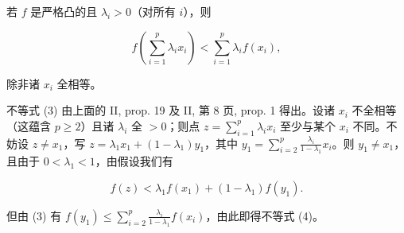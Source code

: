若 \(f\) 是严格凸的且 \(\lambda_i > 0\)（对所有 \(i\)），则

\[
f \left(\sum_ {i = 1} ^ {p} \lambda_ {i} x _ {i}\right) <   \sum_ {i = 1} ^ {p} \lambda_ {i} f \left(x _ {i}\right),\tag{4}
\]

除非诸 \(x_{i}\) 全相等。

不等式 (3) 由上面的 II, prop. 19 及 II, 第 8 页, prop. 1 得出。设诸 \(x_{i}\) 不全相等（这蕴含 \(p \geqslant 2\)）且诸 \(\lambda_{i}\) 全 \(>0\)；则点 \(z = \sum_{i=1}^{p} \lambda_{i} x_{i}\) 至少与某个 \(x_{i}\) 不同。不妨设 \(z \neq x_{1}\)，写 \(z = \lambda_{1} x_{1} + (1 - \lambda_{1}) y_{1}\)，其中 \(y_{1} = \sum_{i=2}^{p} \frac{\lambda_{i}}{1 - \lambda_{1}} x_{i}\)。则 \(y_{1} \neq x_{1}\)，且由于 \(0 < \lambda_{1} < 1\)，由假设我们有

\[
f (z) <   \lambda_ {1} f (x _ {1}) + (1 - \lambda_ {1}) f (y _ {1}).
\]

但由 (3) 有 \(f(y_{1}) \leqslant \sum_{i=2}^{p} \frac{\lambda_{i}}{1 - \lambda_{1}} f(x_{i})\)，由此即得不等式 (4)。

